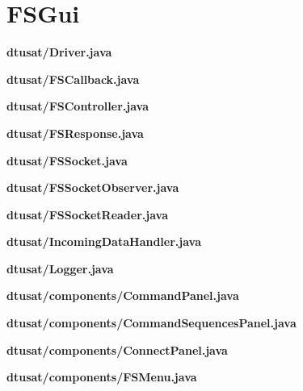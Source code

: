 \section{FSGui}
\textbf{dtusat/Driver.java}

\textbf{dtusat/FSCallback.java}

\textbf{dtusat/FSController.java}

\textbf{dtusat/FSResponse.java}

\textbf{dtusat/FSSocket.java}

\textbf{dtusat/FSSocketObserver.java}

\textbf{dtusat/FSSocketReader.java}

\textbf{dtusat/IncomingDataHandler.java}

\textbf{dtusat/Logger.java}

\textbf{dtusat/components/CommandPanel.java}

\textbf{dtusat/components/CommandSequencesPanel.java}

\textbf{dtusat/components/ConnectPanel.java}

\textbf{dtusat/components/FSMenu.java}
